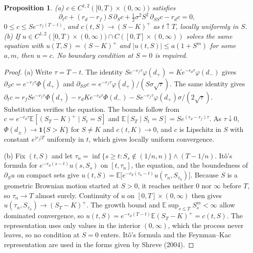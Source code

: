 \documentclass[11pt]{article}
\newtheorem{proposition}{Proposition}
\theoremstyle{remark}
\newcommand{\E}{\mathbb{E}}
\begin{document}
\begin{proposition}
(a) $c\in C^{1,2}([0,T)\times(0,\infty))$ satisfies
\[
\partial_tc+(r_d-r_f)S\,\partial_Sc+\tfrac12\sigma^2S^2\,\partial_{SS}c-r_dc=0,
\]
$0\le c\le Se^{-r_f(T-t)}$, and $c(t,S)\to(S-K)^+$ as $t\uparrow T$, locally uniformly in $S$. (b) If $u\in C^{1,2}([0,T)\times(0,\infty))\cap C([0,T]\times(0,\infty))$ solves the same equation with $u(T,S)=(S-K)^+$ and $|u(t,S)|\le a(1+S^m)$ for some $a,m$, then $u=c$. No boundary condition at $S=0$ is required.
\end{proposition}

\begin{proof}
(a) Write $\tau=T-t$. The identity $Se^{-r_f\tau}\varphi(d_+)=Ke^{-r_d\tau}\varphi(d_-)$ gives $\partial_Sc=e^{-r_f\tau}\Phi(d_+)$ and $\partial_{SS}c=e^{-r_f\tau}\varphi(d_+)/(S\sigma\sqrt\tau)$. The same identity gives $\partial_tc=r_fSe^{-r_f\tau}\Phi(d_+)-r_dKe^{-r_d\tau}\Phi(d_-)-Se^{-r_f\tau}\varphi(d_+)\sigma/(2\sqrt\tau)$. Substitution verifies the equation. The bounds follow from $c=e^{-r_d\tau}\E[(S_T-K)^+\mid S_t=S]$ and $\E[S_T\mid S_t=S]=Se^{(r_d-r_f)\tau}$. As $\tau\downarrow0$, $\Phi(d_\pm)\to\mathbf 1\{S>K\}$ for $S\ne K$ and $c(t,K)\to0$, and $c$ is Lipschitz in $S$ with constant $e^{|r_f|T}$ uniformly in $t$, which gives locally uniform convergence.

(b) Fix $(t,S)$ and let $\tau_n=\inf\{s\ge t:S_s\notin(1/n,n)\}\wedge(T-1/n)$. It\^o's formula for $e^{-r_d(s-t)}u(s,S_s)$ on $[t,\tau_n]$, the equation, and the boundedness of $\partial_Su$ on compact sets give $u(t,S)=\E\bigl[e^{-r_d(\tau_n-t)}u(\tau_n,S_{\tau_n})\bigr]$. Because $S$ is a geometric Brownian motion started at $S>0$, it reaches neither $0$ nor $\infty$ before $T$, so $\tau_n\to T$ almost surely. Continuity of $u$ on $[0,T]\times(0,\infty)$ then gives $u(\tau_n,S_{\tau_n})\to(S_T-K)^+$. The growth bound and $\E\sup_{s\le T}S_s^m<\infty$ allow dominated convergence, so $u(t,S)=e^{-r_d(T-t)}\E(S_T-K)^+=c(t,S)$. The representation uses only values in the interior $(0,\infty)$, which the process never leaves, so no condition at $S=0$ enters. It\^o's formula and the Feynman--Kac representation are used in the forms given by Shreve (2004).
\end{proof}
\end{document}
